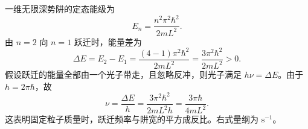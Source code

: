 一维无限深势阱的定态能级为
\[
E_n=\frac{n^2\pi^2\hbar^2}{2mL^2}.
\]
由 $n=2$ 向 $n=1$ 跃迁时，能量差为
\[
\Delta E=E_2-E_1
=\frac{(4-1)\pi^2\hbar^2}{2mL^2}
=\frac{3\pi^2\hbar^2}{2mL^2}>0.
\]
假设跃迁的能量全部由一个光子带走，且忽略反冲，则光子满足 $h\nu=\Delta E$。由于 $h=2\pi\hbar$，故
\[
\boxed{\nu=\frac{\Delta E}{h}
=\frac{3\pi^2\hbar^2}{2mL^2h}
=\frac{3\pi\hbar}{4mL^2}}.
\]
这表明固定粒子质量时，跃迁频率与阱宽的平方成反比。右式量纲为 $\mathrm{s^{-1}}$。
